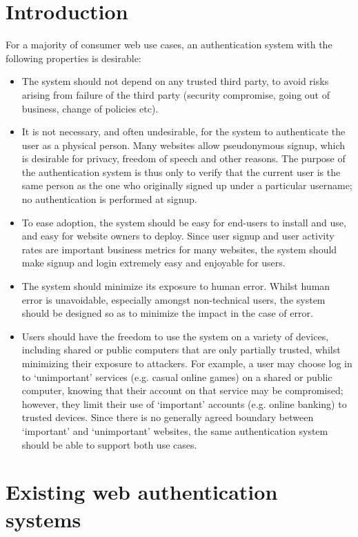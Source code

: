 \section{Introduction}

For a majority of consumer web use cases, an authentication system with the following properties is
desirable:

\begin{itemize}
\item The system should not depend on any trusted third party, to avoid risks arising from failure
of the third party (security compromise, going out of business, change of policies etc).
\item It is not necessary, and often undesirable, for the system to authenticate the user as a
physical person. Many websites allow pseudonymous signup, which is desirable for privacy, freedom of
speech and other reasons. The purpose of the authentication system is thus only to verify that the
current user is the same person as the one who originally signed up under a particular username; no
authentication is performed at signup.
\item To ease adoption, the system should be easy for end-users to install and use, and easy for
website owners to deploy. Since user signup and user activity rates are important business metrics
for many websites, the system should make signup and login extremely easy and enjoyable for users.
\item The system should minimize its exposure to human error. Whilst human error is unavoidable,
especially amongst non-technical users, the system should be designed so as to minimize the impact
in the case of error.
\item Users should have the freedom to use the system on a variety of devices, including shared or
public computers that are only partially trusted, whilst minimizing their exposure to attackers.
For example, a user may choose log in to `unimportant' services (e.g. casual online games) on a
shared or public computer, knowing that their account on that service may be compromised; however,
they limit their use of `important' accounts (e.g. online banking) to trusted devices. Since there
is no generally agreed boundary between `important' and `unimportant' websites, the same
authentication system should be able to support both use cases.
\end{itemize}


\section{Existing web authentication systems}
